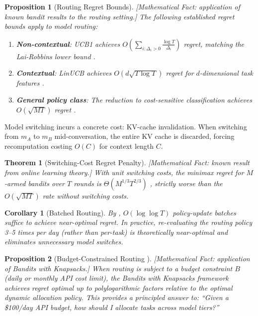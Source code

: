 \documentclass[11pt, a4paper]{googledeepmind}
\newtheorem{theorem}{Theorem}[section]
\newtheorem{proposition}{Proposition}[section]
\newtheorem{corollary}{Corollary}[section]
\begin{document}
\begin{proposition}[Routing Regret Bounds]
\emph{[Mathematical Fact: application of known bandit results to the routing setting.]}
\label{prop:routing-regret}
The following established regret bounds apply to model routing:
\begin{enumerate}[label=(\alph*), nosep]
\item \textbf{Non-contextual}: UCB1 achieves $O\left(\sum_{i: \Delta_i > 0} \frac{\log T}{\Delta_i}\right)$ regret, matching the Lai-Robbins lower bound \citep{auer2002, laiRobbins1985}.
\item \textbf{Contextual}: LinUCB achieves $O(d\sqrt{T \log T})$ regret for $d$-dimensional task features \citep{li2010linucb}.
\item \textbf{General policy class}: The reduction to cost-sensitive classification achieves $O(\sqrt{MT})$ regret \citep{agarwal2014monster}.
\end{enumerate}
\end{proposition}

Model switching incurs a concrete cost: KV-cache invalidation. When switching from $m_A$ to $m_B$ mid-conversation, the entire KV cache is discarded, forcing recomputation costing $O(C)$ for context length $C$.

\begin{theorem}[Switching-Cost Regret Penalty]
\emph{[Mathematical Fact: known result from online learning theory.]}
\label{thm:routing-switching}
With unit switching costs, the minimax regret for $M$-armed bandits over $T$ rounds is $\Theta(M^{1/3} T^{2/3})$ \citep{dekel2014switching}, strictly worse than the $O(\sqrt{MT})$ rate without switching costs.
\end{theorem}

\begin{corollary}[Batched Routing]
\label{cor:routing-batched}
By \citet{perchet2016batched}, $O(\log \log T)$ policy-update batches suffice to achieve near-optimal regret. In practice, re-evaluating the routing policy 3--5 times per day (rather than per-task) is theoretically near-optimal and eliminates unnecessary model switches.
\end{corollary}

\begin{proposition}[Budget-Constrained Routing {\citep{badanidiyuru2018bwk}}]
\emph{[Mathematical Fact: application of Bandits with Knapsacks.]}
\label{prop:routing-bwk}
When routing is subject to a budget constraint $B$ (daily or monthly API cost limit), the Bandits with Knapsacks framework achieves regret optimal up to polylogarithmic factors relative to the optimal dynamic allocation policy. This provides a principled answer to: ``Given a \$100/day API budget, how should I allocate tasks across model tiers?''
\end{proposition}
\end{document}
